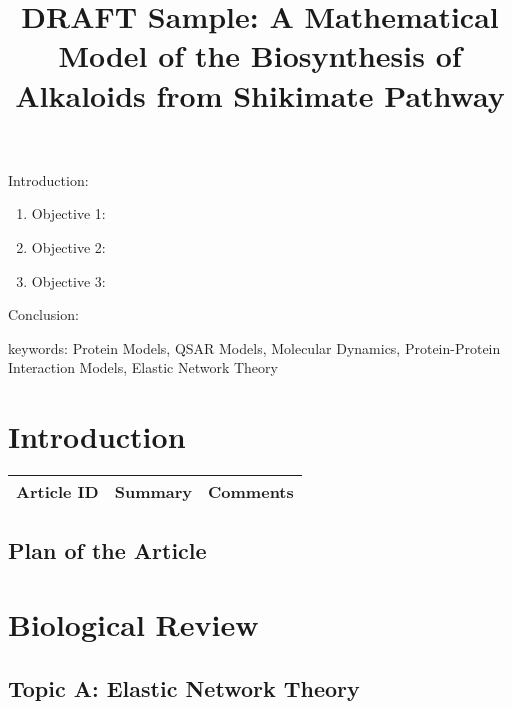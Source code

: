 


\twocolumn
\scriptsize
\begin{frontmatter}
		\title{DRAFT Sample: A Mathematical Model of the Biosynthesis of Alkaloids from Shikimate Pathway}
		\author{}
		\address{The Mathematical Learning Space}
\end{frontmatter}	

Introduction:
\begin{enumerate}
\item Objective 1:
\item Objective 2:
\item Objective 3:
\end{enumerate}
Conclusion:

keywords: Protein Models, QSAR Models, Molecular Dynamics, Protein-Protein Interaction Models, Elastic Network Theory

\section{Introduction}

\begin{table}[H]\centering
	\begin{tabular}{p{1cm}p{4cm}p{3cm}}
		Article ID & Summary & Comments\\
		\hline
		\hline
	\end{tabular}
\end{table}

\subsection{Plan of the Article}

\begin{enumerate}
\end{enumerate}


\section{Biological Review}

\subsection{Topic A: Elastic Network Theory}

